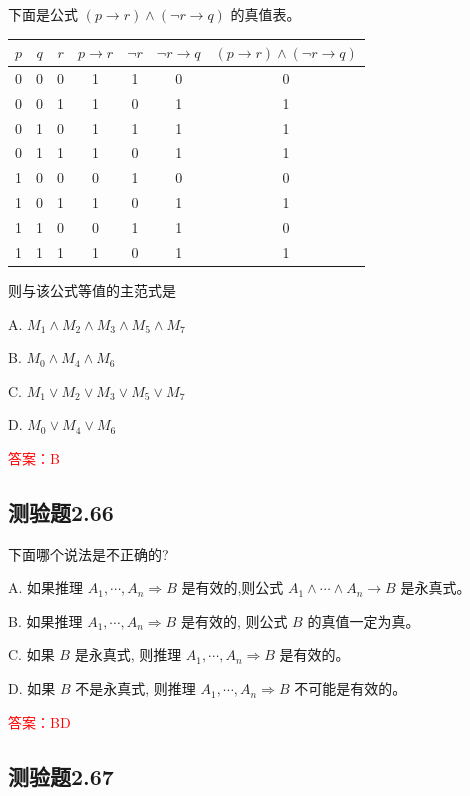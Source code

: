 \documentclass[UTF8, heading=true]{ctexart}
\begin{document}
下面是公式 $(p \rightarrow r) \wedge(\neg r \rightarrow q)$ 的真值表。
\begin{table}[H]
  \centering
\begin{tabular}{c|c|c|c|c|c|c}
\hline$p$ & $q$ & $r$ & $p \rightarrow r$ & $\neg r$ & $\neg r \rightarrow q$ & $(p \rightarrow r) \wedge(\neg r \rightarrow q)$ \\
\hline 0 & 0 & 0 & 1 & 1 & 0 & 0 \\
\hline 0 & 0 & 1 & 1 & 0 & 1 & 1 \\
\hline 0 & 1 & 0 & 1 & 1 & 1 & 1 \\
\hline 0 & 1 & 1 & 1 & 0 & 1 & 1 \\
\hline 1 & 0 & 0 & 0 & 1 & 0 & 0 \\
\hline 1 & 0 & 1 & 1 & 0 & 1 & 1 \\
\hline 1 & 1 & 0 & 0 & 1 & 1 & 0 \\
\hline 1 & 1 & 1 & 1 & 0 & 1 & 1 \\
\hline
\end{tabular}
\end{table}

则与该公式等值的主范式是

A. $
M_1 \wedge M_2 \wedge M_3 \wedge M_5 \wedge M_7
$

B. $
M_0 \wedge M_4 \wedge M_6
$

C. $
M_1 \vee M_2 \vee M_3 \vee M_5 \vee M_7
$

D. $
M_0 \vee M_4 \vee M_6
$

\textcolor{red}{答案：B}

\subsection{测验题2.66}

下面哪个说法是不正确的?

A. 如果推理 $A_1, \cdots, A_n \Longrightarrow B$ 是有效的,则公式 $A_1 \wedge \cdots \wedge A_n \rightarrow B$ 是永真式。

B. 如果推理 $A_1, \cdots, A_n \Longrightarrow B$ 是有效的, 则公式 $B$ 的真值一定为真。

C. 如果 $B$ 是永真式, 则推理 $A_1, \cdots, A_n \Longrightarrow B$ 是有效的。

D. 如果 $B$ 不是永真式, 则推理 $A_1, \cdots, A_n \Longrightarrow B$ 不可能是有效的。


\textcolor{red}{答案：BD}

\subsection{测验题2.67}
\end{document}
